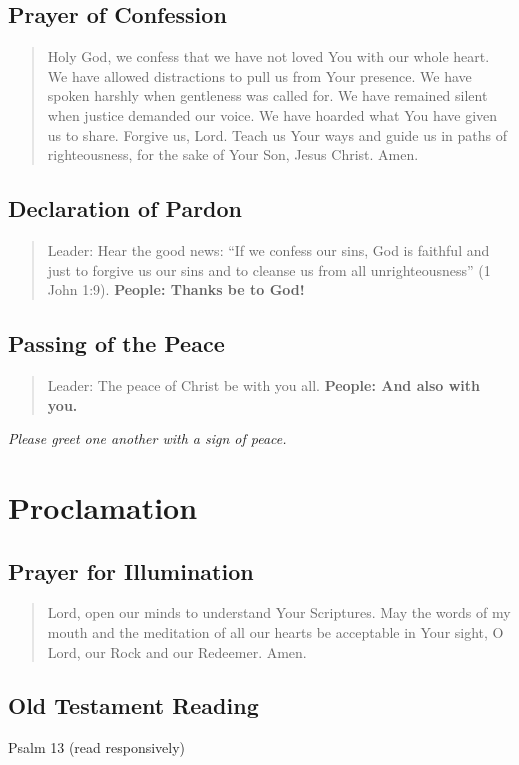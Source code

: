 \documentclass[
    language=english,
    doctype=liturgy,
    institution=none,
]{../../omnilatex}
\begin{document}
\subsection{Prayer of Confession}
\begin{quote}
Holy God, we confess that we have not loved You with our whole heart. We have allowed distractions to pull us from Your presence. We have spoken harshly when gentleness was called for. We have remained silent when justice demanded our voice. We have hoarded what You have given us to share. Forgive us, Lord. Teach us Your ways and guide us in paths of righteousness, for the sake of Your Son, Jesus Christ. Amen.
\end{quote}

\subsection{Declaration of Pardon}
\begin{quote}
Leader: Hear the good news: ``If we confess our sins, God is faithful and just to forgive us our sins and to cleanse us from all unrighteousness'' (1 John 1:9).
\textbf{People: Thanks be to God!}
\end{quote}

\subsection{Passing of the Peace}
\begin{quote}
Leader: The peace of Christ be with you all.
\textbf{People: And also with you.}
\end{quote}
\textit{Please greet one another with a sign of peace.}

\section{Proclamation}

\subsection{Prayer for Illumination}
\begin{quote}
Lord, open our minds to understand Your Scriptures. May the words of my mouth and the meditation of all our hearts be acceptable in Your sight, O Lord, our Rock and our Redeemer. Amen.
\end{quote}

\subsection{Old Testament Reading}
Psalm 13 (read responsively)
\end{document}
